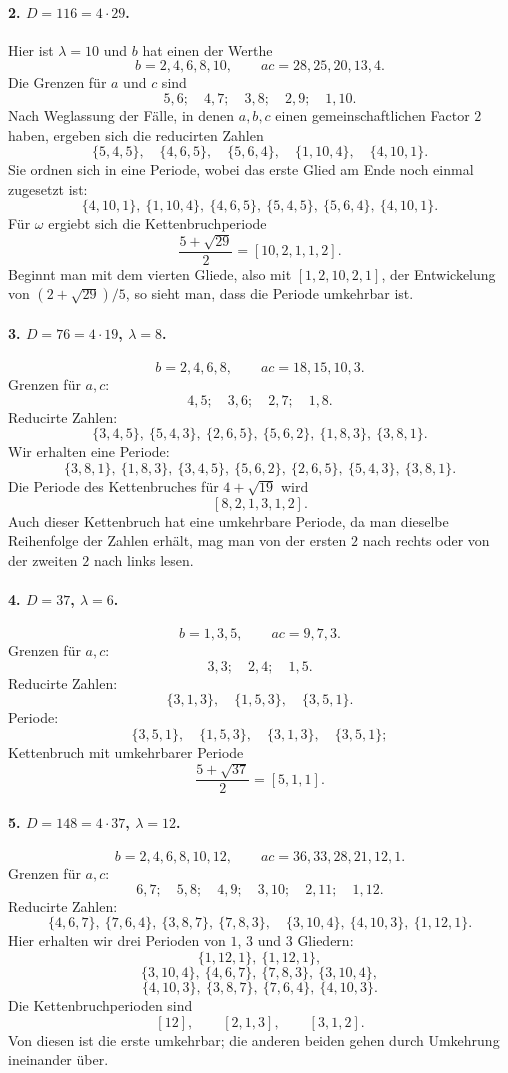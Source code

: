 \documentclass[11pt]{article}
\begin{document}
\paragraph{2. $D=116=4\cdot29$.}
Hier ist $\lambda=10$ und $b$ hat einen der Werthe
\[
        b=2,4,6,8,10,\qquad
        ac=28,25,20,13,4.
\]
Die Grenzen für $a$ und $c$ sind
\[
        5,6;\quad 4,7;\quad 3,8;\quad 2,9;\quad 1,10.
\]
Nach Weglassung der Fälle, in denen $a,b,c$ einen gemeinschaftlichen Factor $2$ haben, ergeben sich die reducirten Zahlen
\[
\{5,4,5\},\quad \{4,6,5\},\quad \{5,6,4\},\quad
\{1,10,4\},\quad \{4,10,1\}.
\]
Sie ordnen sich in eine Periode, wobei das erste Glied am Ende noch einmal zugesetzt ist:
\[
\{4,10,1\},\ \{1,10,4\},\ \{4,6,5\},\ \{5,4,5\},\ \{5,6,4\},\ \{4,10,1\}.
\]
Für $\omega$ ergiebt sich die Kettenbruchperiode
\[
        \frac{5+\sqrt{29}}2=[10,2,1,1,2].
\]
Beginnt man mit dem vierten Gliede, also mit $[1,2,10,2,1]$, der Entwickelung von $(2+\sqrt{29})/5$, so sieht man, dass die Periode umkehrbar ist.

\paragraph{3. $D=76=4\cdot19$, $\lambda=8$.}
\[
        b=2,4,6,8,\qquad ac=18,15,10,3.
\]
Grenzen für $a,c$:
\[
        4,5;\quad 3,6;\quad 2,7;\quad 1,8.
\]
Reducirte Zahlen:
\[
\{3,4,5\},\ \{5,4,3\},\ \{2,6,5\},\ \{5,6,2\},\ \{1,8,3\},\ \{3,8,1\}.
\]
Wir erhalten eine Periode:
\[
\{3,8,1\},\ \{1,8,3\},\ \{3,4,5\},\ \{5,6,2\},\ \{2,6,5\},\ \{5,4,3\},\ \{3,8,1\}.
\]
Die Periode des Kettenbruches für $4+\sqrt{19}$ wird
\[
        [8,2,1,3,1,2].
\]
Auch dieser Kettenbruch hat eine umkehrbare Periode, da man dieselbe Reihenfolge der Zahlen erhält, mag man von der ersten $2$ nach rechts oder von der zweiten $2$ nach links lesen.

\paragraph{4. $D=37$, $\lambda=6$.}
\[
        b=1,3,5,\qquad ac=9,7,3.
\]
Grenzen für $a,c$:
\[
        3,3;\quad 2,4;\quad 1,5.
\]
Reducirte Zahlen:
\[
        \{3,1,3\},\quad \{1,5,3\},\quad \{3,5,1\}.
\]
Periode:
\[
        \{3,5,1\},\quad \{1,5,3\},\quad \{3,1,3\},\quad \{3,5,1\};
\]
Kettenbruch mit umkehrbarer Periode
\[
        \frac{5+\sqrt{37}}2=[5,1,1].
\]

\paragraph{5. $D=148=4\cdot37$, $\lambda=12$.}
\[
 b=2,4,6,8,10,12,\qquad ac=36,33,28,21,12,1.
\]
Grenzen für $a,c$:
\[
6,7;\quad 5,8;\quad 4,9;\quad 3,10;\quad 2,11;\quad 1,12.
\]
Reducirte Zahlen:
\[
\{4,6,7\},\ \{7,6,4\},\ \{3,8,7\},\ \{7,8,3\},
\quad \{3,10,4\},\ \{4,10,3\},\ \{1,12,1\}.
\]
Hier erhalten wir drei Perioden von $1$, $3$ und $3$ Gliedern:
\[
\{1,12,1\},\ \{1,12,1\},
\]
\[
\{3,10,4\},\ \{4,6,7\},\ \{7,8,3\},\ \{3,10,4\},
\]
\[
\{4,10,3\},\ \{3,8,7\},\ \{7,6,4\},\ \{4,10,3\}.
\]
Die Kettenbruchperioden sind
\[
        [12],\qquad [2,1,3],\qquad [3,1,2].
\]
Von diesen ist die erste umkehrbar; die anderen beiden gehen durch Umkehrung ineinander über.
\end{document}
